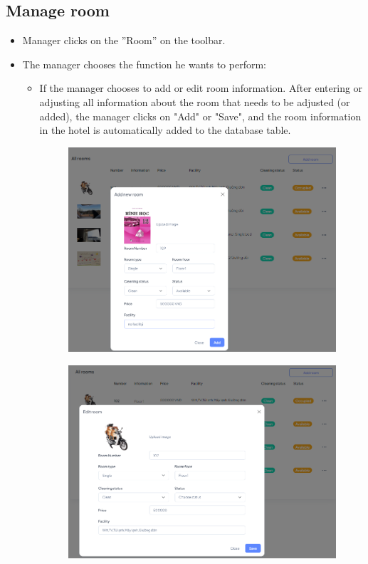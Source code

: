     \subsection{Manage room}
    \begin{itemize}
        \item Manager clicks on the ”Room” on the toolbar.
        \item The manager chooses the function he wants to perform:
        \begin{itemize}
            \item If the manager chooses to add or edit room information. After entering or adjusting all information about the room that needs to be adjusted (or added), the manager clicks on "Add" or "Save", and the room information in the hotel is automatically added to the database table.
            \begin{figure}[H]
                \includegraphics[width=1\linewidth]{img/addroom.png}
                \label{fig:addroom}
            \end{figure}
            \begin{figure}[H]
                \includegraphics[width=1\linewidth]{img/editroom.png}

\end{figure}
\end{itemize}
\end{itemize}
